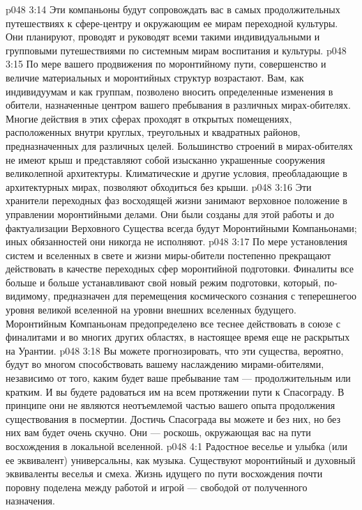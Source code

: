\vs p048 3:14 \pc {}\bibnobreakspace {} Эти компаньоны будут сопровождать вас в самых продолжительных путешествиях к сфере\hyp{}центру и окружающим ее мирам переходной культуры. Они планируют, проводят и руководят всеми такими индивидуальными и групповыми путешествиями по системным мирам воспитания и культуры.
\vs p048 3:15 \pc {}\bibnobreakspace {} По мере вашего продвижения по моронтийному пути, совершенство и величие материальных и моронтийных структур возрастают. Вам, как индивидуумам и как группам, позволено вносить определенные изменения в обители, назначенные центром вашего пребывания в различных мирах\hyp{}обителях. Многие действия в этих сферах проходят в открытых помещениях, расположенных внутри круглых, треугольных и квадратных районов, предназначенных для различных целей. Большинство строений в мирах\hyp{}обителях не имеют крыш и представляют собой изысканно украшенные сооружения великолепной архитектуры. Климатические и другие условия, преобладающие в архитектурных мирах, позволяют обходиться без крыши.
\vs p048 3:16 \pc Эти хранители переходных фаз восходящей жизни занимают верховное положение в управлении моронтийными делами. Они были созданы для этой работы и до фактуализации Верховного Существа всегда будут Моронтийными Компаньонами; иных обязанностей они никогда не исполняют.
\vs p048 3:17 По мере установления систем и вселенных в свете и жизни миры\hyp{}обители постепенно прекращают действовать в качестве переходных сфер моронтийной подготовки. Финалиты все больше и больше устанавливают свой новый режим подготовки, который, по\hyp{}видимому, предназначен для перемещения космического сознания с теперешнегоо уровня великой вселенной на уровни внешних вселенных будущего. Моронтийным Компаньонам предопределено все теснее действовать в союзе с финалитами и во многих других областях, в настоящее время еще не раскрытых на Урантии.
\vs p048 3:18 Вы можете прогнозировать, что эти существа, вероятно, будут во многом способствовать вашему наслаждению мирами\hyp{}обителями, независимо от того, каким будет ваше пребывание там --- продолжительным или кратким. И вы будете радоваться им на всем протяжении пути к Спасограду. В принципе они не являются неотъемлемой частью вашего опыта продолжения существования в посмертии. Достичь Спасограда вы можете и без них, но без них вам будет очень скучно. Они --- роскошь, окружающая вас на пути восхождения в локальной вселенной.
\vs p048 4:1 Радостное веселье и улыбка (или ее эквивалент) универсальны, как музыка. Существуют моронтийный и духовный эквиваленты веселья и смеха. Жизнь идущего по пути восхождения почти поровну поделена между работой и игрой --- свободой от полученного назначения.

